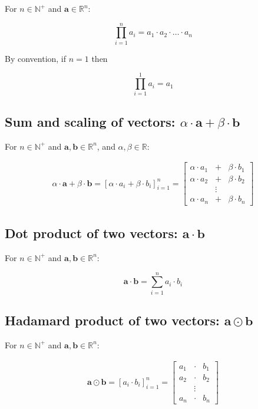 \documentclass[titlepage]{article}
\begin{document}
        For $n \in \mathbb{N}^+$ and $\mathbf{a} \in \mathbb{R}^n$:

        $$\prod_{i=1}^n a_i = a_1 \cdot a_2 \cdot \ldots \cdot a_n$$

        By convention, if $n=1$ then

        $$\prod_{i=1}^1 a_i = a_1$$

      \subsection{%
        Sum and scaling of vectors:
        $\alpha \cdot \mathbf{a} + \beta \cdot \mathbf{b}$
      }

        For $n \in \mathbb{N}^+$ and $\mathbf{a}, \mathbf{b} \in \mathbb{R}^n$,
        and $\alpha, \beta \in \mathbb{R}$:

        \begin{align*}
          \alpha \cdot \mathbf{a} + \beta \cdot \mathbf{b}
            = \left[ \alpha \cdot a_i + \beta \cdot b_i \right]_{i=1}^n
            = \begin{bmatrix}
                \alpha \cdot a_1 & + & \beta \cdot b_1 \\
                \alpha \cdot a_2 & + & \beta \cdot b_2 \\
                & \vdots & \\
                \alpha \cdot a_n & + & \beta \cdot b_n
              \end{bmatrix}
        \end{align*}

      \subsection{Dot product of two vectors: $\mathbf{a} \cdot \mathbf{b}$}

        For $n \in \mathbb{N}^+$ and $\mathbf{a}, \mathbf{b} \in \mathbb{R}^n$:

        $$\mathbf{a} \cdot \mathbf{b} = \sum_{i=1}^n a_i \cdot b_i$$

      \subsection{%
        Hadamard product of two vectors: $\mathbf{a} \odot \mathbf{b}$
      }

        For $n \in \mathbb{N}^+$ and $\mathbf{a}, \mathbf{b} \in \mathbb{R}^n$:

        \begin{align*}
          \mathbf{a} \odot \mathbf{b}
            = \left[ a_i \cdot b_i \right]_{i=1}^n
            = \begin{bmatrix}
                a_1 & \cdot & b_1 \\
                a_2 & \cdot & b_2 \\
                & \vdots & \\
                a_n & \cdot & b_n
              \end{bmatrix}
        \end{align*}
\end{document}
